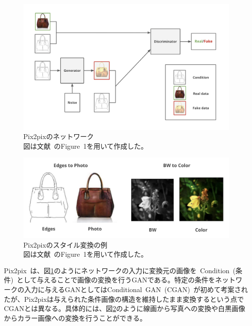 \begin{figure}[t]
\begin{center}
\includegraphics[width=\hsize]{figure/pix2pix_net.png}
\caption{Pix2pixのネットワーク\\
図は文献~\cite{pix2pix}のFigure~1を用いて作成した。}
\label{fig:pix2pix_net}
\end{center}
\end{figure}

\begin{figure}[t]
\begin{center}
\includegraphics[width=\hsize]{figure/pix2pix_img.png}
\caption{Pix2pixのスタイル変換の例\\
図は文献~\cite{pix2pix}のFigure~1を用いて作成した。}
\label{fig:pix2pix_img}
\end{center}
\end{figure}

Pix2pix~\cite{pix2pix}は、図\ref{fig:pix2pix_net}のようにネットワークの入力に変換元の画像を~Condition~(条件)~として与えることで画像の変換を行うGANである。特定の条件をネットワークの入力に与えるGANとしてはConditional~GAN~(CGAN)~\cite{CGAN}が初めて考案されたが、Pix2pixは与えられた条件画像の構造を維持したまま変換するという点でCGANとは異なる。具体的には、図\ref{fig:pix2pix_img}のように線画から写真への変換や白黒画像からカラー画像への変換を行うことができる。

